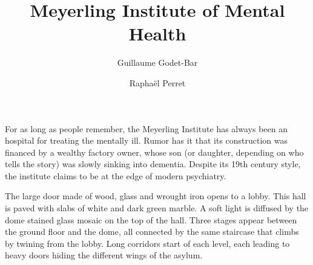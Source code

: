 \documentclass{rpg_location}
\title{Meyerling Institute of Mental Health}
\begin{document}
\author{Guillaume Godet-Bar \and Rapha\"el Perret}
\maketitle


For as long as people remember, the Meyerling Institute has always been an
hospital for treating the mentally ill. Rumor has it that its construction was
financed by a wealthy factory owner, whose son (or daughter, depending on who
tells the story) was slowly sinking into dementia. Despite its 19th century
style, the institute claims to be at the edge of modern psychiatry.

The large door made of wood, glass and wrought iron opens to a lobby. This hall is paved with slabs of white and dark green marble. A soft light is diffused by the dome stained glass mosaic on the top of the hall. Three stages appear between the ground floor and the dome, all connected by the same staircase that climbs by twining from the lobby. Long corridors start of each level, each leading to heavy doors hiding the different wings of the asylum.
\end{document}
